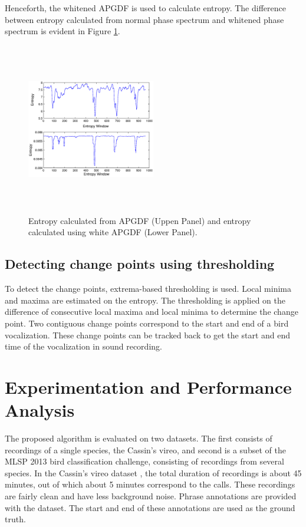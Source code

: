 \documentclass[a4paper]{article}
\begin{document}
Henceforth, the whitened APGDF is used to calculate entropy. The difference between entropy calculated from normal phase spectrum and whitened phase spectrum is evident in Figure \ref{fig:entropy}.

\begin{figure}[h]
\centering
\includegraphics[width=0.5\textwidth,height=7.5cm]{Entropy_gd_white_non_white.eps}
\caption{ Entropy calculated from APGDF (Uppen Panel) and entropy calculated using white APGDF (Lower Panel).}
\label{fig:entropy}
\end{figure}



\subsection{Detecting change points using thresholding}



   
To detect the change points, extrema-based thresholding is used. Local minima and maxima are estimated on the entropy.  The thresholding is applied on the difference of  consecutive local maxima and local minima to determine the change point.  Two contiguous change points correspond to the start and end of a bird vocalization. These change points can be tracked back to get the start and end time of the vocalization in sound recording.     
   
   
   




\section{Experimentation and Performance Analysis}


The proposed algorithm is evaluated on two datasets. The first consists of recordings of a single species, the Cassin's vireo,
and second is a subset of the MLSP 2013 bird classification challenge, consisting of recordings from several species. In
the Cassin's vireo dataset \cite{data1}, the total duration of recordings
is about 45 minutes, out of which about 5 minutes correspond
to the calls. These recordings are fairly clean and have less
background noise. Phrase annotations are provided with the dataset. The start and end of these annotations are used as the ground truth. 
\end{document}
